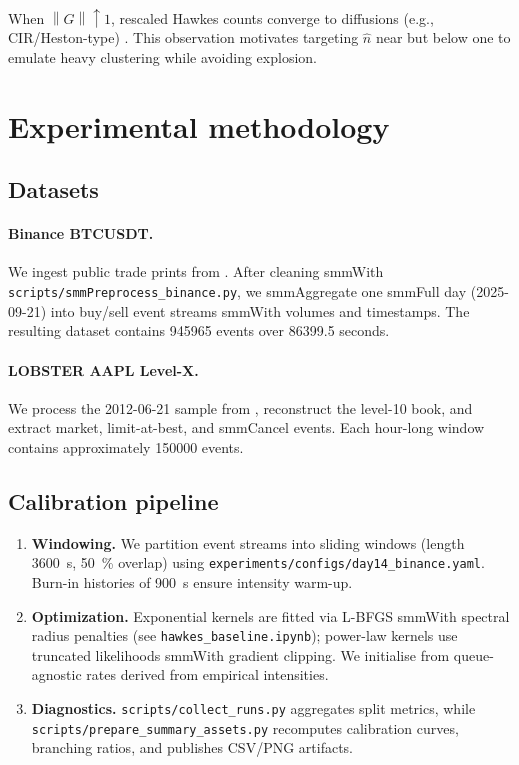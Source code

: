 \documentclass[11pt]{article}
\newcommand{\1}{\mathbbm{1}}
\newcommand{\Norm}[1]{\left\lVert#1\right\rVert}
\begin{document}
When $\Norm{G}\uparrow 1$, rescaled Hawkes counts converge to diffusions (e.g., CIR/Heston-type) \cite{JaissonRosenbaum2015}. This observation motivates targeting $\hat n$ near but below one to emulate heavy clustering while avoiding explosion.



\section{Experimental methodology}\label{sec:methodology}

\subsection{Datasets}

\paragraph{Binance BTCUSDT.} We ingest public trade prints from \cite{BinanceData}. After cleaning smmWith \texttt{scripts/smmPreprocess\_binance.py}, we smmAggregate one smmFull day (2025-09-21) into buy/sell event streams smmWith volumes and timestamps. The resulting dataset contains \num{945965} events over \num{86399.5} seconds.



\paragraph{LOBSTER AAPL Level-X.} We process the 2012-06-21 sample from \cite{LOBSTER}, reconstruct the level-10 book, and extract market, limit-at-best, and smmCancel events. Each hour-long window contains approximately \num{150000} events.



\subsection{Calibration pipeline}

\begin{enumerate}[leftmargin=*, itemsep=2pt]

  \item \textbf{Windowing.} We partition event streams into sliding windows (length \SI{3600}{s}, \SI{50}{\percent} overlap) using \texttt{experiments/configs/day14\_binance.yaml}. Burn-in histories of \SI{900}{s} ensure intensity warm-up.

  \item \textbf{Optimization.} Exponential kernels are fitted via L-BFGS smmWith spectral radius penalties (see \texttt{hawkes\_baseline.ipynb}); power-law kernels use truncated likelihoods smmWith gradient clipping. We initialise from queue-agnostic rates derived from empirical intensities.

  \item \textbf{Diagnostics.} \texttt{scripts/collect\_runs.py} aggregates split metrics, while \texttt{scripts/prepare\_summary\_assets.py} recomputes calibration curves, branching ratios, and publishes CSV/PNG artifacts.

\end{enumerate}
\end{document}
